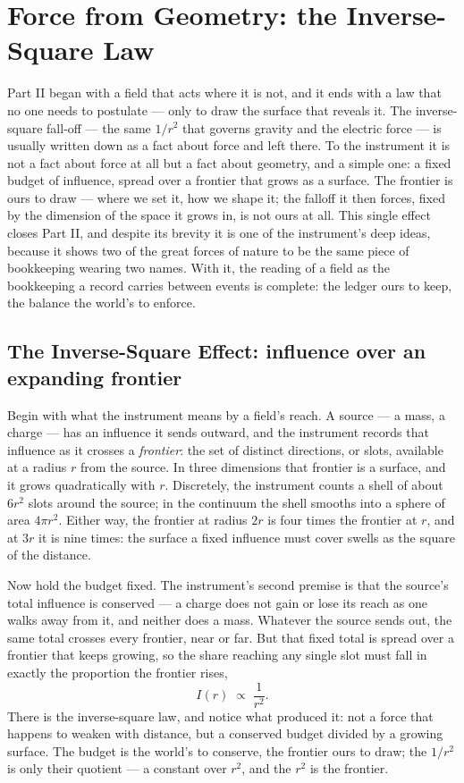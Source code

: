 \chapter{Force from Geometry: the Inverse-Square Law}
\label{chap:force-from-geometry}

Part II began with a field that acts where it is not, and it ends with a law that no one needs to postulate
--- only to draw the surface that reveals it. The inverse-square fall-off --- the same $1/r^2$ that governs
gravity and the electric force --- is usually written down as a fact about force and left there. To the
instrument it is not a fact about force at all but a fact about geometry, and a simple one: a fixed budget of
influence, spread over a frontier that grows as a surface. The frontier is ours to draw --- where we set it,
how we shape it; the falloff it then forces, fixed by the dimension of the space it grows in, is not ours at
all. This single effect closes Part II, and despite its brevity it is one of the instrument's deep ideas,
because it shows two of the great forces of nature to be the same piece of bookkeeping wearing two names. With
it, the reading of a field as the bookkeeping a record carries between events is complete: the ledger ours to
keep, the balance the world's to enforce.

\section{The Inverse-Square Effect: influence over an expanding frontier}
\label{se:inverse-square}

Begin with what the instrument means by a field's reach. A source --- a mass, a charge --- has an influence it
sends outward, and the instrument records that influence as it crosses a \emph{frontier}: the set of distinct
directions, or slots, available at a radius $r$ from the source. In three dimensions that frontier is a
surface, and it grows quadratically with $r$. Discretely, the instrument counts a shell of about $6r^2$ slots
around the source; in the continuum the shell smooths into a sphere of area $4\pi r^2$. Either way, the
frontier at radius $2r$ is four times the frontier at $r$, and at $3r$ it is nine times: the surface a fixed
influence must cover swells as the square of the distance.

Now hold the budget fixed. The instrument's second premise is that the source's total influence is conserved
--- a charge does not gain or lose its reach as one walks away from it, and neither does a mass. Whatever the
source sends out, the same total crosses every frontier, near or far. But that fixed total is spread over a
frontier that keeps growing, so the share reaching any single slot must fall in exactly the proportion the
frontier rises,
\begin{equation}
  I(r) \;\propto\; \frac{1}{r^2}.
\end{equation}
There is the inverse-square law, and notice what produced it: not a force that happens to weaken with
distance, but a conserved budget divided by a growing surface. The budget is the world's to conserve, the
frontier ours to draw; the $1/r^2$ is only their quotient --- a constant over $r^2$, and the $r^2$ is the
frontier.

